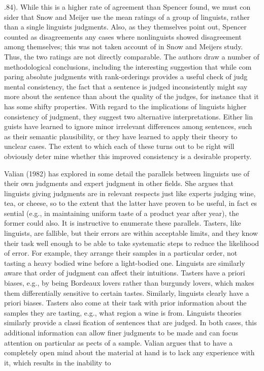 \begin{styleTextbody}
.84). While this is a higher rate of agreement than Spencer found, we must con\- sider that Snow and Meijer use the mean ratings of a group of linguists, rather than a single linguist{\textquotesingle}s judgments. Also, as they themselves point out, Spencer counted as disagreements any cases where nonlinguists showed disagreement among themselves; this was not taken account of in Snow and Meijer{\textquotesingle}s study. Thus, the two ratings are not directly comparable. The authors draw a number of methodological conclusions, including the interesting suggestion that while com\- paring absolute judgments with rank-orderings provides a useful check of judg\- mental consistency, the fact that a sentence is judged inconsistently might say more about the sentence than about the quality of the judges, for instance that it has some shifty properties. With regard to the implications of linguists{\textquotesingle} higher consistency of judgment, they suggest two alternative interpretations. Either lin\- guists have learned to ignore minor irrelevant differences among sentences, such as their semantic plausibility, or they have learned to apply their theory to unclear cases. The extent to which each of these turns out to be right will obviously deter\- mine whether this improved consistency is a desirable property.
\end{styleTextbody}


\begin{styleTextbody}
Valian (1982) has explored in some detail the parallels between linguists{\textquotesingle} use of their own judgments and expert judgment in other fields. She argues that linguists giving judgments are in relevant respects just like experts judging wine, tea, or cheese, so to the extent that the latter have proven to be useful, in fact es\- sential (e.g., in maintaining uniform taste of a product year after year), the former could also. It is instructive to enumerate these parallels. Tasters, like linguists, are fallible, but their errors are within acceptable limits, and they know their task well enough to be able to take systematic steps to reduce the likelihood of error. For example, they arrange their samples in a particular order, not tasting a heavy\- bodied wine before a light-bodied one. Linguists are similarly aware that order of judgment can affect their intuitions. Tasters have a priori biases, e.g., by being Bordeaux lovers rather than burgundy lovers, which makes them differentially sensitive to certain tastes. Similarly, linguists clearly have a priori biases. Tasters also come at their task with prior information about the samples they are tasting, e.g., what region a wine is from. Linguists{\textquotesingle} theories similarly provide a classi\- fication of sentences that are judged. In both cases, this additional information can allow finer judgments to be made and can focus attention on particular as\- pects of a sample. Valian argues that to have a completely open mind about the material at hand is to lack any experience with it, which results in the inability to
\end{styleTextbody}


